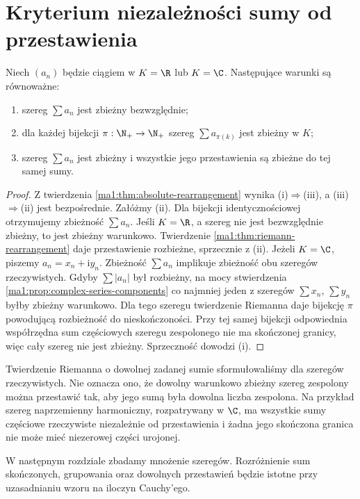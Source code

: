 \section{Kryterium niezależności sumy od przestawienia}
\begin{twierdzenie}
\label{ma1:thm:unconditional-absolute}
Niech $(a_n)$ będzie ciągiem w $K=\R$ lub $K=\C$. Następujące warunki są równoważne:
\begin{enumerate}[label=(\roman*)]
\item szereg $\sum a_n$ jest zbieżny bezwzględnie;
\item dla każdej bijekcji $\pi:\N_+\to\N_+$ szereg $\sum a_{\pi(k)}$ jest zbieżny w $K$;
\item szereg $\sum a_n$ jest zbieżny i wszystkie jego przestawienia są zbieżne do tej samej sumy.
\end{enumerate}
\end{twierdzenie}
\begin{proof}
Z twierdzenia \ref{ma1:thm:absolute-rearrangement} wynika (i)$\Rightarrow$(iii), a (iii)$\Rightarrow$(ii) jest bezpośrednie.
Załóżmy (ii). Dla bijekcji identycznościowej otrzymujemy zbieżność $\sum a_n$. Jeśli $K=\R$, a szereg nie jest bezwzględnie zbieżny, to jest zbieżny warunkowo. Twierdzenie \ref{ma1:thm:riemann-rearrangement} daje przestawienie rozbieżne, sprzecznie z (ii).
Jeżeli $K=\C$, piszemy $a_n=x_n+\mathrm i y_n$. Zbieżność $\sum a_n$ implikuje zbieżność obu szeregów rzeczywistych. Gdyby $\sum|a_n|$ był rozbieżny, na mocy stwierdzenia \ref{ma1:prop:complex-series-components} co najmniej jeden z szeregów $\sum x_n$, $\sum y_n$ byłby zbieżny warunkowo. Dla tego szeregu twierdzenie Riemanna daje bijekcję $\pi$ powodującą rozbieżność do nieskończoności. Przy tej samej bijekcji odpowiednia współrzędna sum częściowych szeregu zespolonego nie ma skończonej granicy, więc cały szereg nie jest zbieżny. Sprzeczność dowodzi (i).
\end{proof}

\begin{uwaga}
Twierdzenie Riemanna o dowolnej zadanej sumie sformułowaliśmy dla szeregów rzeczywistych. Nie oznacza ono, że dowolny warunkowo zbieżny szereg zespolony można przestawić tak, aby jego sumą była dowolna liczba zespolona. Na przykład szereg naprzemienny harmoniczny, rozpatrywany w $\C$, ma wszystkie sumy częściowe rzeczywiste niezależnie od przestawienia i żadna jego skończona granica nie może mieć niezerowej części urojonej.
\end{uwaga}
W następnym rozdziale zbadamy mnożenie szeregów. Rozróżnienie sum skończonych, grupowania oraz dowolnych przestawień będzie istotne przy uzasadnianiu wzoru na iloczyn Cauchy'ego.
